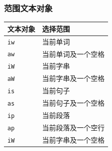 \subsubsection{范围文本对象}
\begin{longtable}{ll}\hline\hline

	\textbf{文本对象} & \textbf{选择范围}\\

    \endhead

	\texttt{iw} & 当前单词\\

	\texttt{aw} & 当前单词及一个空格 \\
	
	\texttt{iW} & 当前字串 \\

	\texttt{aW} & 当前字串及一个空格 \\

	\texttt{is} & 当前句子 \\

	\texttt{as} & 当前句子及一个空格 \\

	\texttt{ip} & 当前段落 \\

	\texttt{ap} & 当前段落及一个空行 \\

	\texttt{iW} & 当前字串及一个空格 \\
    \hline
\end{longtable}
